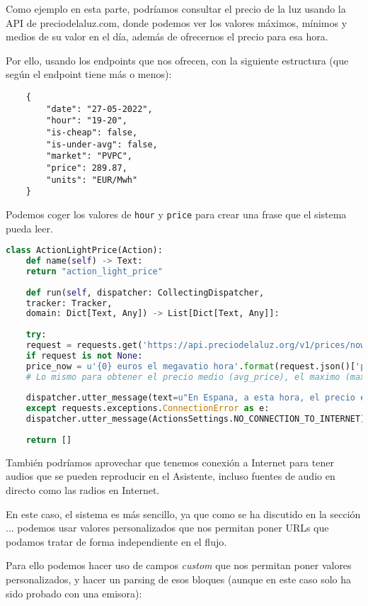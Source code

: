 Como ejemplo en esta parte, podríamos consultar el precio de la luz usando la API de preciodelaluz.com, donde podemos ver los valores máximos, mínimos y medios de su valor en el día, además de ofrecernos el precio para esa hora.

Por ello, usando los endpoints que nos ofrecen, con la siguiente estructura (que según el endpoint tiene más o menos):
\begin{lstlisting}
	{
		"date": "27-05-2022",
		"hour": "19-20",
		"is-cheap": false,
		"is-under-avg": false,
		"market": "PVPC",
		"price": 289.87,
		"units": "EUR/Mwh"
	}
\end{lstlisting}

Podemos coger los valores de \texttt{hour} y \texttt{price} para crear una frase que el sistema pueda leer.
\begin{lstlisting}[language=Python]
	class ActionLightPrice(Action):
	def name(self) -> Text:
	return "action_light_price"
	
	def run(self, dispatcher: CollectingDispatcher,
	tracker: Tracker,
	domain: Dict[Text, Any]) -> List[Dict[Text, Any]]:
	
	try:
	request = requests.get('https://api.preciodelaluz.org/v1/prices/now?zone=PCB')
	if request is not None:
	price_now = u'{0} euros el megavatio hora'.format(request.json()['price'])
	# Lo mismo para obtener el precio medio (avg_price), el maximo (max_price) y el minimo (min_price)
	
	dispatcher.utter_message(text=u"En Espana, a esta hora, el precio es de {0}. De media, hoy pagaremos {1}, siendo la hora mas barata {2}; y la mas cara {3}".format(price_now,avg_price,min_price,max_price))
	except requests.exceptions.ConnectionError as e:
	dispatcher.utter_message(ActionsSettings.NO_CONNECTION_TO_INTERNET)
	
	return []
\end{lstlisting}

También podríamos aprovechar que tenemos conexión a Internet para tener audios que se pueden reproducir en el Asistente, incluso fuentes de audio en directo como las radios en Internet.

En este caso, el sistema es más sencillo, ya que como se ha discutido en la sección ... podemos usar valores personalizados que nos permitan poner URLs que podamos tratar de forma independiente en el flujo.

Para ello podemos hacer uso de campos \textit{custom} que nos permitan poner valores personalizados, y hacer un parsing de esos bloques (aunque en este caso solo ha sido probado con una emisora):

